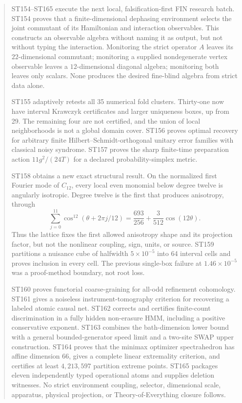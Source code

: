 \documentclass[11pt,a4paper]{article}
\begin{document}
\begin{abstract}
ST154--ST165 execute the next local, falsification-first FIN research batch. ST154 proves that a finite-dimensional dephasing environment selects the joint commutant of its Hamiltonian and interaction observables. This constructs an observable algebra without naming it as output, but not without typing the interaction. Monitoring the strict operator $A$ leaves its $22$-dimensional commutant; monitoring a supplied nondegenerate vertex observable leaves a $12$-dimensional diagonal algebra; monitoring both leaves only scalars. None produces the desired fine-blind algebra from strict data alone.

ST155 adaptively retests all 35 numerical fold clusters. Thirty-one now have interval Krawczyk certificates and larger uniqueness boxes, up from 29. The remaining four are not certified, and the union of local neighborhoods is not a global domain cover. ST156 proves optimal recovery for arbitrary finite Hilbert--Schmidt-orthogonal unitary error families with classical noisy syndrome. ST157 proves the sharp finite-time preparation action $11g^2/(24T)$ for a declared probability-simplex metric.

ST158 obtains a new exact structural result. On the normalized first Fourier mode of $C_{12}$, every local even monomial below degree twelve is angularly isotropic. Degree twelve is the first that produces anisotropy, through
\[
\sum_{j=0}^{11}\cos^{12}(\theta+2\pi j/12)=\frac{693}{256}+\frac{3}{512}\cos(12\theta).
\]
Thus the lattice fixes the first allowed anisotropy shape and its projection factor, but not the nonlinear coupling, sign, units, or source. ST159 partitions a nuisance cube of halfwidth $5\times10^{-5}$ into 64 interval cells and proves inclusion in every cell. The previous single-box failure at $1.46\times10^{-5}$ was a proof-method boundary, not root loss.

ST160 proves functorial coarse-graining for all-odd refinement cohomology. ST161 gives a noiseless instrument-tomography criterion for recovering a labeled atomic causal net. ST162 corrects and certifies finite-count discrimination in a fully hidden non-erasure HMM, including a positive conservative exponent. ST163 combines the bath-dimension lower bound with a general bounded-generator speed limit and a two-site SWAP upper construction. ST164 proves that the minimax optimizer spectrahedron has affine dimension $66$, gives a complete linear extremality criterion, and certifies at least $4{,}213{,}597$ partition extreme points. ST165 packages eleven independently typed operational atoms and supplies deletion witnesses. No strict environment coupling, selector, dimensional scale, apparatus, physical projection, or Theory-of-Everything closure follows.
\end{abstract}
\end{document}
